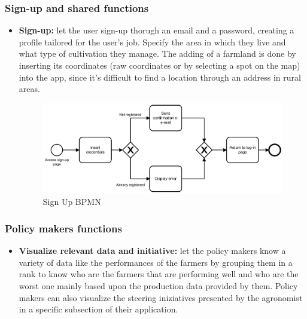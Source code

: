 \documentclass[table, 12pt]{article}
\begin{document}
\subsubsection{Sign-up and shared functions}
\begin{itemize}
    \item \textbf{Sign-up:} let the user sign-up thorugh an email and a password, creating a profile tailored for the user's job. Specify the area in which they live and what type of cultivation they manage. The adding of a farmland is done by inserting its coordinates (raw coordinates or by selecting a spot on the map) into the app, since it's difficult to find a location through an address in rural areas.
    \begin{center}
        \begin{figure}[!h]
            \includegraphics[width=\textwidth]{assets/BPMN/SignUpBpmn}
            \caption{Sign Up BPMN}
            \label{fig: singup}
        \end{figure}
    \end{center}
\end{itemize}
\subsubsection{Policy makers functions}
\begin{itemize}                                 
    \item \textbf{Visualize relevant data and initiative: }let the policy makers know a variety of data like the performances of the farmers by grouping them in a rank to know who are the farmers that are performing well and who are the worst one mainly based upon the production data provided by them.
    Policy makers can also visualize the steering iniziatives presented by the agronomist in a specific subsection of their application.
\end{itemize}
\end{document}
